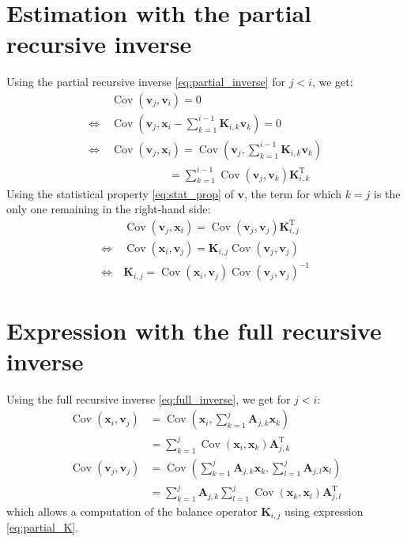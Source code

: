 \documentclass[12pt]{scrartcl}
\DeclareMathOperator{\Cov}{Cov}
\begin{document}
\section{Estimation with the partial recursive inverse}
Using the partial recursive inverse \eqref{eq:partial_inverse} for $j < i$, we get:
\begin{align}
&\Cov\left(\mathbf{v}_j,\mathbf{v}_i\right) = 0 \\
\Leftrightarrow \ &\Cov\left(\mathbf{v}_j,\mathbf{x}_i - \sum_{k=1}^{i-1} \mathbf{K}_{i,k} \mathbf{v}_k\right) = 0 \\
\Leftrightarrow \ &\Cov\left(\mathbf{v}_j,\mathbf{x}_i\right) =\Cov\left(\mathbf{v}_j,\sum_{k=1}^{i-1} \mathbf{K}_{i,k} \mathbf{v}_k\right) \\
& \qquad \qquad \quad \ = \sum_{k=1}^{i-1}\Cov\left(\mathbf{v}_j,\mathbf{v}_k\right) \mathbf{K}_{i,k}^\mathrm{T}
\end{align}
Using the statistical property \eqref{eq:stat_prop} of $\mathbf{v}$, the term for which $k=j$ is the only one remaining in the right-hand side:
\begin{align}
\label{eq:partial_K}
&\Cov\left(\mathbf{v}_j,\mathbf{x}_i\right) =\Cov\left(\mathbf{v}_j,\mathbf{v}_j\right) \mathbf{K}_{i,j}^\mathrm{T} \nonumber \\
\Leftrightarrow \ &\Cov\left(\mathbf{x}_i,\mathbf{v}_j\right) = \mathbf{K}_{i,j}\Cov\left(\mathbf{v}_j,\mathbf{v}_j\right) \nonumber \\
\Leftrightarrow \ & \mathbf{K}_{i,j} = \Cov\left(\mathbf{x}_i,\mathbf{v}_j\right)\Cov\left(\mathbf{v}_j,\mathbf{v}_j\right)^{-1}
\end{align}

\section{Expression with the full recursive inverse}
Using the full recursive inverse \eqref{eq:full_inverse}, we get for $j < i$:
\begin{subequations}
\begin{align}
\Cov\left(\mathbf{x}_i,\mathbf{v}_j\right) & = \Cov\left(\mathbf{x}_i,\sum_{k=1}^j \mathbf{A}_{j,k} \mathbf{x}_k\right) \nonumber \\
 & = \sum_{k=1}^j\Cov\left(\mathbf{x}_i,\mathbf{x}_k\right) \mathbf{A}_{j,k}^\mathrm{T} \\
\Cov\left(\mathbf{v}_j,\mathbf{v}_j\right) & = \Cov\left(\sum_{k=1}^j \mathbf{A}_{j,k} \mathbf{x}_k,\sum_{l=1}^j \mathbf{A}_{j,l} \mathbf{x}_l\right) \nonumber \\
 & = \sum_{k=1}^j \mathbf{A}_{j,k} \sum_{l=1}^j \Cov\left(\mathbf{x}_k,\mathbf{x}_l\right) \mathbf{A}_{j,l}^\mathrm{T}
\end{align}
\end{subequations}
which allows a computation of the balance operator $\mathbf{K}_{i,j}$ using expression \eqref{eq:partial_K}.
\end{document}
